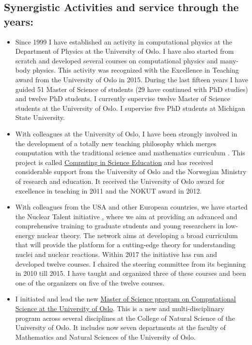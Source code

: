 \documentclass[a4wide,10pt]{article}
\begin{document}
\subsection*{Synergistic Activities and service through the years:}

\begin{itemize}
\item Since 1999 I have   established an activity in computational physics  at the  Department of Physics at the University of Oslo. I have also started from scratch and developed several  courses on computational physics and many-body physics. This activity was recognized with the Excellence in Teaching award from the University of Oslo in 2015. During the last fifteen years I have guided  51 Master of Science of students (29 have continued with PhD studies) and twelve PhD students.  I currently supervise twelve Master of Science students at the University of Oslo. I supervise five PhD students at Michigan State University.

\item With colleagues at the University of Oslo, I have   been strongly involved in the development of a totally new teaching philosophy which merges computation with the traditional science amd mathematics curriculum . This project is called \href{{http://www.mn.uio.no/english/about/collaboration/cse/}}{Computing in Science Education} and has received considerable support from the University of Oslo and the Norwegian Ministry of research and education.  It received the University of Oslo award for excellence in teaching  in 2011 and the NOKUT award in 2012. 

\item With colleagues from the USA and other European countries, we have started the Nuclear Talent initiative \href{http://www.nucleartalent.org},  where we aim  at providing an advanced and comprehensive training to graduate students and young researchers in low-energy nuclear theory.  The network aims at developing a broad curriculum that will provide the platform for a cutting-edge theory for understanding nuclei and nuclear reactions.  Within 2017 the initiative has run and developed twelve courses. I chaired the steering committee from its beginning in 2010 till 2015. I have taught and organized three of these courses and been one of the organizers on five of the twelve courses.

\item I initiated and lead the new \href{{http://www.uio.no/english/studies/programmes/computational-science-master/}}{Master of Science program on Computational Science at the University of Oslo}. This is a new and multi-disciplinary program across several disciplines at the College of Natural Science of the University of Oslo. It includes now seven  departments at the faculty of Mathematics and Natural Sciences of  the University of Oslo.
\end{itemize}
\end{document}

